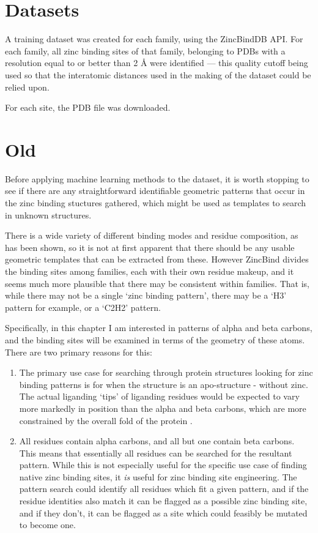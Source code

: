 \section{Datasets}
A training dataset was created for each family, using the ZincBindDB API. For each family, all zinc binding sites of that family, belonging to PDBs with a resolution equal to or better than 2 {\AA} were identified --- this quality cutoff being used so that the interatomic distances used in the making of the dataset could be relied upon.

For each site, the PDB file was downloaded.


\section{Old}


Before applying machine learning methods to the dataset, it is worth stopping to see if there are any straightforward identifiable geometric patterns that occur in the zinc binding stuctures gathered, which might be used as templates to search in unknown structures.

There is a wide variety of different binding modes and residue composition, as has been shown, so it is not at first apparent that there should be any usable geometric templates that can be extracted from these. However ZincBind divides the binding sites among families, each with their own residue makeup, and it seems much more plausible that there may be consistent within families. That is, while there may not be a single `zinc binding pattern', there may be a `H3' pattern for example, or a `C2H2' pattern.

Specifically, in this chapter I am interested in patterns of alpha and beta carbons, and the binding sites will be examined in terms of the geometry of these atoms. There are two primary reasons for this:

\begin{enumerate}
   \item The primary use case for searching through protein structures looking for zinc binding patterns is for when the structure is an apo-structure - without zinc. The actual liganding `tips' of liganding residues would be expected to vary more markedly in position than the alpha and beta carbons, which are more constrained by the overall fold of the protein .
   \item All residues contain alpha carbons, and all but one contain beta carbons. This means that essentially all residues can be searched for the resultant pattern. While this is not especially useful for the specific use case of finding native zinc binding sites, it \emph{is} useful for zinc binding site engineering. The pattern search could identify all residues which fit a given pattern, and if the residue identities also match it can be flagged as a possible zinc binding site, and if they don't, it can be flagged as a site which could feasibly be mutated to become one.
\end{enumerate}

